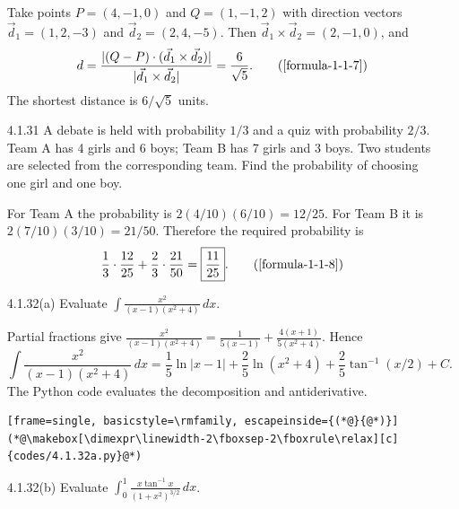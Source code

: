 \begin{enumerate}[label={},leftmargin=1.15cm,labelwidth=1.0cm,labelsep=0.15cm,itemindent=0pt,listparindent=0pt,itemsep=\baselineskip,parsep=0pt,topsep=0pt]
\vspace{0.6em}\par\solution


Take points $P=(4,-1,0)$ and $Q=(1,-1,2)$ with direction vectors $\vec d_1=(1,2,-3)$ and $\vec d_2=(2,4,-5)$. Then $\vec d_1\times\vec d_2=(2,-1,0)$, and
\begin{equation*}
d=\frac{|(Q-P)\cdot(\vec d_1\times\vec d_2)|}{|\vec d_1\times\vec d_2|}=\frac{6}{\sqrt5}.
\tag*{(\ref{formula-1-1-7})}\end{equation*}
The shortest distance is $\boxed{6/\sqrt5}$ units.

\item[4.1.31] A debate is held with probability $1/3$ and a quiz with probability $2/3$. Team A has 4 girls and 6 boys; Team B has 7 girls and 3 boys. Two students are selected from the corresponding team. Find the probability of choosing one girl and one boy.

\vspace{0.6em}\par\solution


For Team A the probability is $2(4/10)(6/10)=12/25$. For Team B it is $2(7/10)(3/10)=21/50$. Therefore the required probability is
\begin{equation*}
\frac13\cdot\frac{12}{25}+\frac23\cdot\frac{21}{50}=\boxed{\frac{11}{25}}.
\tag*{(\ref{formula-1-1-8})}\end{equation*}

\item[4.1.32(a)] Evaluate $\displaystyle\int\frac{x^2}{(x-1)(x^2+4)}\,dx$.

\vspace{0.6em}\par\solution

Partial fractions give $\frac{x^2}{(x-1)(x^2+4)}=\frac{1}{5(x-1)}+\frac{4(x+1)}{5(x^2+4)}$. Hence
\[
\boxed{\int\frac{x^2}{(x-1)(x^2+4)}\,dx=\frac15\ln|x-1|+\frac25\ln(x^2+4)+\frac25\tan^{-1}(x/2)+C}.
\]
The Python code evaluates the decomposition and antiderivative.
\begin{lstlisting}[frame=single, basicstyle=\rmfamily, escapeinside={(*@}{@*)}]
(*@\makebox[\dimexpr\linewidth-2\fboxsep-2\fboxrule\relax][c]{codes/4.1.32a.py}@*)
\end{lstlisting}

\item[4.1.32(b)] Evaluate $\displaystyle\int_0^1\frac{x\tan^{-1}x}{(1+x^2)^{3/2}}\,dx$.

\vspace{0.6em}\par\solution


\end{enumerate}

